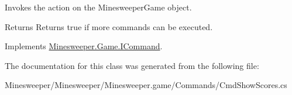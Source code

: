 Invokes the action on the Minesweeper\+Game object. 

\begin{DoxyReturn}{Returns}
Returns true if more commands can be executed.
\end{DoxyReturn}


Implements \hyperlink{interface_minesweeper_1_1_game_1_1_i_command_a03482e68480cad46a8cf419a87440cc9}{Minesweeper.\+Game.\+I\+Command}.



The documentation for this class was generated from the following file\+:\begin{DoxyCompactItemize}
\item 
Minesweeper/\+Minesweeper/\+Minesweeper.\+game/\+Commands/Cmd\+Show\+Scores.\+cs\end{DoxyCompactItemize}
